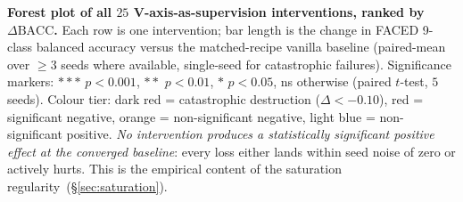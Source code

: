 \textbf{Forest plot of all $25$ V-axis-as-supervision interventions,
ranked by $\Delta\mathrm{BACC}$.}
Each row is one intervention; bar length is the change in FACED
9-class balanced accuracy versus the matched-recipe vanilla baseline
(paired-mean over $\geq 3$ seeds where available, single-seed for
catastrophic failures). Significance markers: $\ast{\ast}\ast$
$p{<}0.001$, $\ast\ast$ $p{<}0.01$, $\ast$ $p{<}0.05$, ns otherwise
(paired $t$-test, $5$ seeds). Colour tier: dark red = catastrophic
destruction ($\Delta{<}{-}0.10$), red = significant negative,
orange = non-significant negative, light blue = non-significant
positive. \emph{No intervention produces a statistically significant
positive effect at the converged baseline}: every loss either lands
within seed noise of zero or actively hurts. This is the empirical
content of the saturation regularity~(\S\ref{sec:saturation}).
